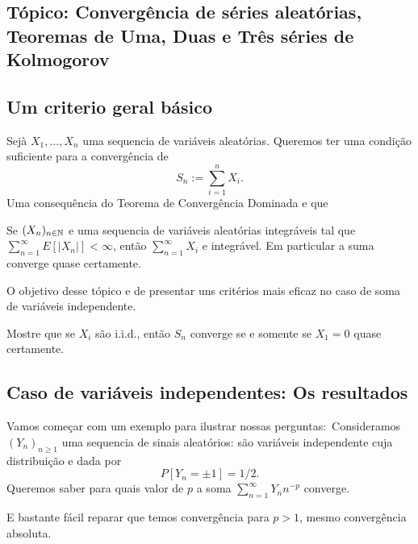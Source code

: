 \newpage
\begin{topics}
  \section[Tópico: Séries de Kolmogorov]
  {Tópico: Convergência de séries aleatórias,\\
Teoremas de Uma, Duas e Três séries de Kolmogorov}

\subsection{Um criterio geral básico}

Sejà $X_1,\dots, X_n$ uma sequencia de variáveis aleatórias.
Queremos ter uma condição suficiente para a convergência de
\begin{equation}
S_n:= \sum_{i=1}^n X_i.
\end{equation}
Uma consequência do Teorema de Convergência Dominada e que
\begin{lemma}
 Se $(X_n)_{n\in {\ensuremath{\mathbb N}}}$ e uma sequencia de variáveis aleatórias integráveis tal que
 $\sum_{n=1}^{\infty} E[ |X_n| ]<\infty$,
então $\sum_{n=1}^{\infty} X_i$ e integrável.
Em particular a suma converge quase certamente.
\end{lemma}

O objetivo desse tópico e de presentar uns critérios mais eficaz no caso de soma de variáveis independente.

\begin{exercise}
  Mostre que se $X_i$ são i.i.d., então $S_n$ converge se e somente se $X_1 = 0$ quase certamente.
\end{exercise}

\medskip

\subsection{Caso de variáveis independentes: Os resultados}

Vamos começar com um exemplo para ilustrar nossas perguntas:\
Consideramos $(Y_n)_{n\ge 1}$ uma sequencia de sinais aleatórios: são variáveis independente cuja distribuição e dada por
$$P[Y_n=\pm 1]=1/2.$$
Queremos saber para quais valor de $p$ a soma $\sum_{n=1}^{\infty} Y_n n^{-p}$ converge.

\medskip

E bastante fácil reparar que temos convergência para $p > 1$, mesmo convergência absoluta.

\medskip


\end{topics}
